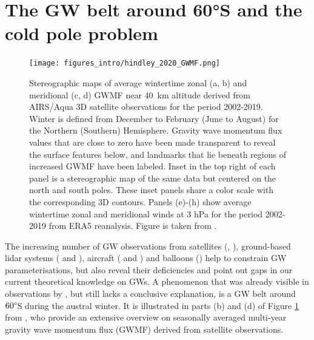 \section{The GW belt around 60°S and the cold pole problem}
\label{sec:waveBelt} %
\begin{figure}[ht]
    \centering
    \texttt{[image: figures\_intro/hindley\_2020\_GWMF.png]}
    \caption{Stereographic maps of average wintertime zonal (a, b) and meridional (c, d) GWMF near \SI{40}{\kilo\meter} altitude derived from AIRS/Aqua 3D satellite observations for the period 2002-2019. Winter is defined from December to February (June to August) for the Northern (Southern) Hemisphere. Gravity wave momentum flux values that are close to zero have been made transparent to reveal the surface features below, and landmarks that lie beneath regions of increased GWMF have been labeled. Inset in the top right of each panel is a stereographic map of the same data but centered on the north and south poles. These inset panels share a color scale with the corresponding 3D contours. Panels (e)-(h) show average wintertime zonal and meridional winds at 3 hPa for the period 2002-2019 from ERA5 reanalysis. Figure is taken from \cite{hindley_18year_2020}.}
    \label{fig:hindley_2020_GWMF}
\end{figure}
%
The increasing number of GW observations from satellites (\cite{hindley_gravity_2019}, \citeyear{hindley_18year_2020}), ground-based lidar systems (\cite{kaifler_lidar_2020} and  \cite{kaifler_compact_2021}), aircraft (\cite{rapp_southtrac-gw_2021} and \cite{fritts_deep_2016}) and  balloons (\cite{plougonven_gravity_2013}) help to constrain GW parameterisations, but also reveal their deficiencies and point out gaps in our current theoretical knowledge on GWs. A phenomenon that was already visible in observations by \textcite{wu_satellite_1996}, but still lacks a conclusive explanation, is a GW belt around $60 \degree$S during the austral winter. It is illustrated in parts (b) and (d) of Figure \ref{fig:hindley_2020_GWMF} from \textcite{hindley_18year_2020}, who provide an extensive overview on seasonally averaged multi-year gravity wave momentum flux (GWMF) derived from satellite observations. \\
